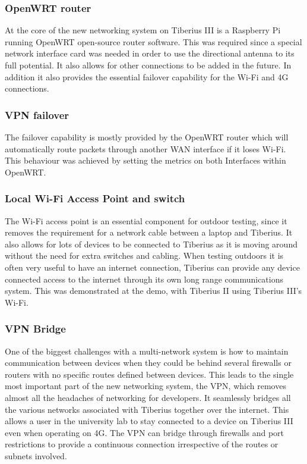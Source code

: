 \subsubsection{OpenWRT router}
At the core of the new networking system on Tiberius III is a Raspberry Pi running OpenWRT open-source router software. This was required since a special network interface card was needed in order to use the directional antenna to its full potential. It also allows for other connections to be added in the future. In addition it also provides the essential failover capability for the Wi-Fi and 4G connections.

\subsubsection{VPN failover}
The failover capability is mostly provided by the OpenWRT router which will automatically route packets through another WAN interface if it loses Wi-Fi. This behaviour was achieved by setting the metrics on both Interfaces within OpenWRT.

\subsubsection{Local Wi-Fi Access Point and switch}
The Wi-Fi access point is an essential component for outdoor testing, since it removes the requirement for a network cable between a laptop and Tiberius. It also allows for lots of devices to be connected to Tiberius as it is moving around without the need for extra switches and cabling. When testing outdoors it is often very useful to have an internet connection, Tiberius can  provide any device connected access to the internet through its own long range communications system. This was demonstrated at the demo, with Tiberius II using Tiberius III's Wi-Fi.

\subsubsection{VPN Bridge} 
One of the biggest challenges with a multi-network system is how to maintain communication between devices when they could be behind several firewalls or routers with no specific routes defined between devices.
\newline
This leads to the single most important part of the new networking system, the VPN, which removes almost all the headaches of networking for developers. It seamlessly bridges all the various networks associated with Tiberius together over the internet. This allows a user in the university lab to stay connected to a device on Tiberius III even when operating on 4G. The VPN can bridge through firewalls and port restrictions to provide a continuous connection irrespective of the routes or subnets involved.


